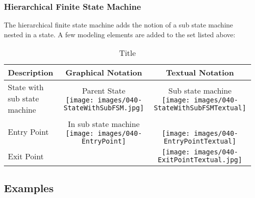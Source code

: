 \subsubsection{Hierarchical Finite State Machine}

The hierarchical finite state machine adds the notion of a sub state machine nested in a state.
A few modeling elements are added to the set listed above:

\begin{table}
\caption{Title}
\begin{tabular}{|b{3cm}|c|c|}
\hline
 \textbf{Description} & \textbf{Graphical Notation} & \textbf{Textual Notation} \\ \hline
 State with sub state machine & \specialcell{Parent State \\ \texttt{[image: images/040-StateWithSubFSM.jpg]}} & \specialcell{Sub state machine \\ \texttt{[image: images/040-StateWithSubFSMTextual]}} \\ \hline
 Entry Point & \specialcell{In sub state machine \\ \texttt{[image: images/040-EntryPoint]}} & \specialcell{ \\ \texttt{[image: images/040-EntryPointTextual]}} \\ \hline
 Exit Point & & \texttt{[image: images/040-ExitPointTextual.jpg]} \\ \hline
\end{tabular}
\end{table}



\subsection{Examples}

